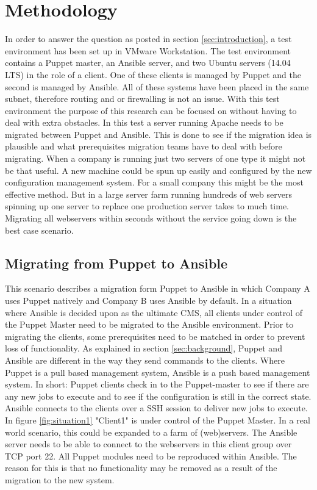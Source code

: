 \section{Methodology}\label{sec:methodology}
In order to answer the question as posted in section \ref{sec:introduction}, a test environment has been set up in VMware Workstation.  The test environment contains a Puppet master, an Ansible server, and two Ubuntu servers (14.04 LTS) in the role of a client. One of these clients is managed by Puppet and the second is managed by Ansible. All of these systems have been placed in the same subnet, therefore routing and or firewalling is not an issue. With this test environment the purpose of this research can be focused on without having to deal with extra obstacles. In this test a server running Apache needs to be migrated between Puppet and Ansible. This is done to see if the migration idea is plausible and what prerequisites migration teams have to deal with before migrating. When a company is running just two servers of one type it might not be that useful. A new machine could be spun up easily and configured by the new configuration management system. For a small company this might be the most effective method. But in a large server farm running hundreds of web servers spinning up one server to replace one production server takes to much time. Migrating all webservers within seconds without the service going down is the best case scenario.  

\subsection{Migrating from Puppet to Ansible}\label{subsec:puppettoansible}
This scenario describes a migration form Puppet to Ansible in which Company A uses Puppet natively and Company B uses Ansible by default. In a situation where Ansible is decided upon as the ultimate CMS, all clients under control of the Puppet Master need to be migrated to the Ansible environment. Prior to migrating the clients, some prerequisites need to be matched in order to prevent loss of functionality. As explained in section \ref{sec:background}, Puppet and Ansible are different in the way they send commands to the clients. Where Puppet is a pull based management system, Ansible is a push based management system. In short: Puppet clients check in to the Puppet-master to see if there are any new jobs to execute and to see if the configuration is still in the correct state. Ansible connects to the clients over a SSH session to deliver new jobs to execute. In figure \ref{fig:situation1} "Client1" is under control of the Puppet Master. In a real world scenario, this could be expanded to a farm of (web)servers. The Ansible server needs to be able to connect to the webservers in this client group over TCP port 22. All Puppet modules need to be reproduced within Ansible. The reason for this is that no functionality may be removed as a result of the migration to the new system. 

